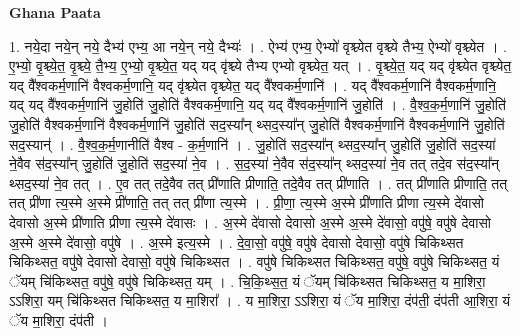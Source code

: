 \documentclass[17pt]{extarticle}
\begin{document}
\textbf{Ghana Paata } \newline

1. नये॒दा नये॒न् नये॒ दैभ्य॑ एभ्य॒ आ नये॒न् नये॒ दैभ्यः॑ । . ऐभ्य॑ एभ्य॒ ऐभ्यो॑ वृश्च्येत वृश्च्ये तैभ्य॒ ऐभ्यो॑ वृश्च्येत । . ए॒भ्यो॒ वृ॒श्च्ये॒त॒ वृ॒श्च्ये॒ तै॒भ्य॒ ए॒भ्यो॒ वृ॒श्च्ये॒त॒ यद् यद् वृ॑श्च्ये तैभ्य एभ्यो वृश्च्येत॒ यत् । . वृ॒श्च्ये॒त॒ यद् यद् वृ॑श्च्येत वृश्च्येत॒ यद् वै᳚श्वकर्म॒णानि॑ वैश्वकर्म॒णानि॒ यद् वृ॑श्च्येत वृश्च्येत॒ यद् वै᳚श्वकर्म॒णानि॑ । . यद् वै᳚श्वकर्म॒णानि॑ वैश्वकर्म॒णानि॒ यद् यद् वै᳚श्वकर्म॒णानि॑ जु॒होति॑ जु॒होति॑ वैश्वकर्म॒णानि॒ यद् यद् वै᳚श्वकर्म॒णानि॑ जु॒होति॑ । . वै॒श्व॒क॒र्म॒णानि॑ जु॒होति॑ जु॒होति॑ वैश्वकर्म॒णानि॑ वैश्वकर्म॒णानि॑ जु॒होति॑ सद॒स्या᳚न् थ्सद॒स्या᳚न् जु॒होति॑ वैश्वकर्म॒णानि॑ वैश्वकर्म॒णानि॑ जु॒होति॑ सद॒स्यान्॑ । . वै॒श्व॒क॒र्म॒णानीति॑ वैश्व - क॒र्म॒णानि॑ । . जु॒होति॑ सद॒स्या᳚न् थ्सद॒स्या᳚न् जु॒होति॑ जु॒होति॑ सद॒स्या॑ ने॒वैव स॑द॒स्या᳚न् जु॒होति॑ जु॒होति॑ सद॒स्या॑ ने॒व । . स॒द॒स्या॑ ने॒वैव स॑द॒स्या᳚न् थ्सद॒स्या॑ ने॒व तत् तदे॒व स॑द॒स्या᳚न् थ्सद॒स्या॑ ने॒व तत् । . ए॒व तत् तदे॒वैव तत् प्री॑णाति प्रीणाति॒ तदे॒वैव तत् प्री॑णाति । . तत् प्री॑णाति प्रीणाति॒ तत् तत् प्री॑णा त्य॒स्मे अ॒स्मे प्री॑णाति॒ तत् तत् प्री॑णा त्य॒स्मे । . प्री॒णा॒ त्य॒स्मे अ॒स्मे प्री॑णाति प्रीणा त्य॒स्मे दे॑वासो देवासो अ॒स्मे प्री॑णाति प्रीणा त्य॒स्मे दे॑वासः । . अ॒स्मे दे॑वासो देवासो अ॒स्मे अ॒स्मे दे॑वासो॒ वपु॑षे॒ वपु॑षे देवासो अ॒स्मे अ॒स्मे दे॑वासो॒ वपु॑षे । . अ॒स्मे इत्य॒स्मे । . दे॒वा॒सो॒ वपु॑षे॒ वपु॑षे देवासो देवासो॒ वपु॑षे चिकिथ्सत चिकिथ्सत॒ वपु॑षे देवासो देवासो॒ वपु॑षे चिकिथ्सत । . वपु॑षे चिकिथ्सत चिकिथ्सत॒ वपु॑षे॒ वपु॑षे चिकिथ्सत॒ यं ॅयम् चि॑किथ्सत॒ वपु॑षे॒ वपु॑षे चिकिथ्सत॒ यम् । . चि॒कि॒थ्स॒त॒ यं ॅयम् चि॑किथ्सत चिकिथ्सत॒ य मा॒शिरा॒ ऽऽशिरा॒ यम् चि॑किथ्सत चिकिथ्सत॒ य मा॒शिरा᳚ । . य मा॒शिरा॒ ऽऽशिरा॒ यं ॅय मा॒शिरा॒ दंप॑ती॒ दंप॑ती आ॒शिरा॒ यं ॅय मा॒शिरा॒ दंप॑ती । \newline
\end{document}
